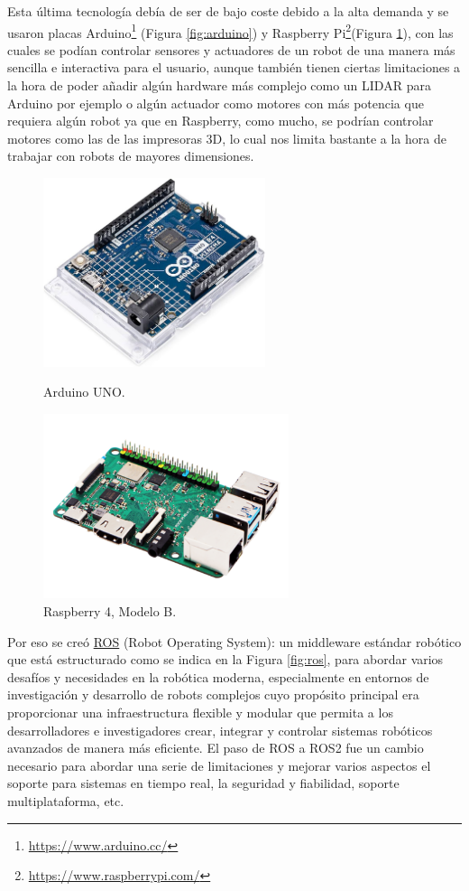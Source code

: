 Esta última tecnología debía de ser de bajo coste debido a la alta demanda y se usaron placas Arduino\footnote{\url{https://www.arduino.cc/}} (Figura \ref{fig:arduino}) y Raspberry Pi\footnote{\url{https://www.raspberrypi.com/}}(Figura \ref{fig:raspberry}), con las cuales se podían controlar sensores y actuadores de un robot de una manera más sencilla e interactiva para el usuario, aunque también tienen ciertas limitaciones a la hora de poder añadir algún hardware más complejo como un LIDAR para Arduino por ejemplo o algún actuador como motores con más potencia que requiera algún robot ya que en Raspberry, como mucho, se podrían controlar motores como las de las impresoras 3D, lo cual nos limita bastante a la hora de trabajar con robots de mayores dimensiones.


\begin{figure}[h!]
  \begin{minipage}{0.48\textwidth}
    \centering
    \includegraphics[width=6.5cm]{figs/arduino_uno.jpg}
    \caption{Arduino UNO.}
    \label{fig:arduino}
  \end{minipage}
  \hfill
  \begin{minipage}{0.48\textwidth}
    \centering
    \includegraphics[width=7.2cm]{figs/raspberry4.png}
    \caption{Raspberry 4, Modelo B.} 
    \label{fig:raspberry}
  \end{minipage}
\end{figure}

Por eso se creó \hyperlink{ROS}{ROS} (Robot Operating System): un middleware estándar robótico que está estructurado como se indica en la Figura \ref{fig:ros}, para abordar varios desafíos y necesidades en la robótica moderna, especialmente en entornos de investigación y desarrollo de robots complejos cuyo propósito principal era proporcionar una infraestructura flexible y modular que permita a los desarrolladores e investigadores crear, integrar y controlar sistemas robóticos avanzados de manera más eficiente. El paso de ROS a ROS2 fue un cambio necesario para abordar una serie de limitaciones y mejorar varios aspectos el soporte para sistemas en tiempo real, la seguridad y fiabilidad, soporte multiplataforma, etc.



